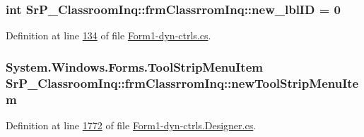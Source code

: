 \hypertarget{class_sr_p___classroom_inq_1_1frm_classrrom_inq_a561cfd5c0d34d4adcb14aee4efc01643}{
\subsubsection[{new\-\_\-lbl\-I\-D}]{\setlength{\rightskip}{0pt plus 5cm}int {\bf \-Sr\-P\-\_\-\-Classroom\-Inq\-::frm\-Classrrom\-Inq\-::new\-\_\-lbl\-I\-D} = 0}}
\label{class_sr_p___classroom_inq_1_1frm_classrrom_inq_a561cfd5c0d34d4adcb14aee4efc01643}


\-Definition at line \hyperlink{_form1-dyn-ctrls_8cs_source_l00134}{134} of file \hyperlink{_form1-dyn-ctrls_8cs_source}{\-Form1-\/dyn-\/ctrls.\-cs}.

\hypertarget{class_sr_p___classroom_inq_1_1frm_classrrom_inq_ac3197c0c505ec97395ace77a88a8c068}{
\subsubsection[{new\-Tool\-Strip\-Menu\-Item}]{\setlength{\rightskip}{0pt plus 5cm}\-System.\-Windows.\-Forms.\-Tool\-Strip\-Menu\-Item {\bf \-Sr\-P\-\_\-\-Classroom\-Inq\-::frm\-Classrrom\-Inq\-::new\-Tool\-Strip\-Menu\-Item}}}
\label{class_sr_p___classroom_inq_1_1frm_classrrom_inq_ac3197c0c505ec97395ace77a88a8c068}


\-Definition at line \hyperlink{_form1-dyn-ctrls_8_designer_8cs_source_l01772}{1772} of file \hyperlink{_form1-dyn-ctrls_8_designer_8cs_source}{\-Form1-\/dyn-\/ctrls.\-Designer.\-cs}.


